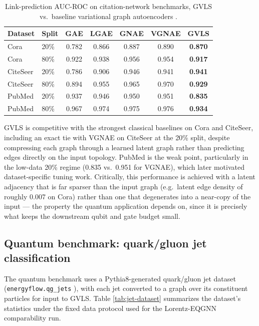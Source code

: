 \documentclass[11pt]{article}
\begin{document}
\begin{table}[h]
  \centering
  \caption{Link-prediction AUC-ROC on citation-network benchmarks, GVLS vs.\ baseline variational graph autoencoders \cite{kipf2016variational, ahn2021variational}.}
  \label{tab:benchmark}
  \begin{tabular}{@{}llccccc@{}}
    \toprule
    \textbf{Dataset} & \textbf{Split} & \textbf{GAE} & \textbf{LGAE} & \textbf{GNAE} & \textbf{VGNAE} & \textbf{GVLS} \\
    \midrule
    Cora & 20\% & 0.782 & 0.866 & 0.887 & 0.890 & \textbf{0.870} \\
    Cora & 80\% & 0.922 & 0.938 & 0.956 & 0.954 & \textbf{0.917} \\
    CiteSeer & 20\% & 0.786 & 0.906 & 0.946 & 0.941 & \textbf{0.941} \\
    CiteSeer & 80\% & 0.894 & 0.955 & 0.965 & 0.970 & \textbf{0.929} \\
    PubMed & 20\% & 0.937 & 0.946 & 0.950 & 0.951 & \textbf{0.835} \\
    PubMed & 80\% & 0.967 & 0.974 & 0.975 & 0.976 & \textbf{0.934} \\
    \bottomrule
  \end{tabular}
\end{table}

GVLS is competitive with the strongest classical baselines on Cora and
CiteSeer, including an exact tie with VGNAE on CiteSeer at the 20\% split,
despite compressing each graph through a learned latent graph rather than
predicting edges directly on the input topology. PubMed is the weak point,
particularly in the low-data 20\% regime (0.835 vs.\ 0.951 for VGNAE), which
later motivated dataset-specific tuning work. Critically, this performance
is achieved with a latent adjacency that is far sparser than the input graph
(e.g.\ latent edge density of roughly 0.007 on Cora) rather than one that
degenerates into a near-copy of the input --- the property the quantum
application depends on, since it is precisely what keeps the downstream
qubit and gate budget small.

\subsection*{Quantum benchmark: quark/gluon jet classification}

The quantum benchmark uses a Pythia8-generated quark/gluon jet dataset
\cite{sjostrand2008pythia} (\texttt{energyflow.qg\_jets}
\cite{komiske2019energyflow}), with each jet converted to a graph over its
constituent particles for input to GVLS. Table \ref{tab:jet-dataset}
summarizes the dataset's statistics under the fixed data protocol used for
the Lorentz-EQGNN \cite{lorentzeqgnn2024} comparability run.
\end{document}
